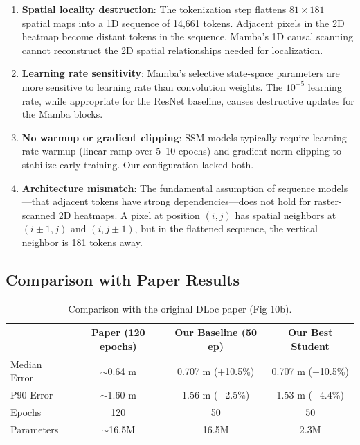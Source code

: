 \documentclass[11pt,a4paper]{article}
\begin{document}
\begin{enumerate}[leftmargin=*]
    \item \textbf{Spatial locality destruction}: The tokenization step flattens $81\times181$ spatial maps into a 1D sequence of 14,661 tokens. Adjacent pixels in the 2D heatmap become distant tokens in the sequence. Mamba's 1D causal scanning cannot reconstruct the 2D spatial relationships needed for localization.

    \item \textbf{Learning rate sensitivity}: Mamba's selective state-space parameters are more sensitive to learning rate than convolution weights. The $10^{-5}$ learning rate, while appropriate for the ResNet baseline, causes destructive updates for the Mamba blocks.

    \item \textbf{No warmup or gradient clipping}: SSM models typically require learning rate warmup (linear ramp over 5--10 epochs) and gradient norm clipping to stabilize early training. Our configuration lacked both.

    \item \textbf{Architecture mismatch}: The fundamental assumption of sequence models---that adjacent tokens have strong dependencies---does not hold for raster-scanned 2D heatmaps. A pixel at position $(i, j)$ has spatial neighbors at $(i\pm1, j)$ and $(i, j\pm1)$, but in the flattened sequence, the vertical neighbor is 181 tokens away.
\end{enumerate}

\subsection{Comparison with Paper Results}

\begin{table}[H]
\centering
\caption{Comparison with the original DLoc paper (Fig 10b).}
\begin{tabular}{lccc}
\toprule
 & \textbf{Paper (120 epochs)} & \textbf{Our Baseline (50 ep)} & \textbf{Our Best Student} \\
\midrule
Median Error & $\sim$0.64 m & 0.707 m (+10.5\%) & 0.707 m (+10.5\%) \\
P90 Error & $\sim$1.60 m & 1.56 m ($-$2.5\%) & 1.53 m ($-$4.4\%) \\
\midrule
Epochs & 120 & 50 & 50 \\
Parameters & $\sim$16.5M & 16.5M & 2.3M \\
\bottomrule
\end{tabular}
\end{table}
\end{document}
